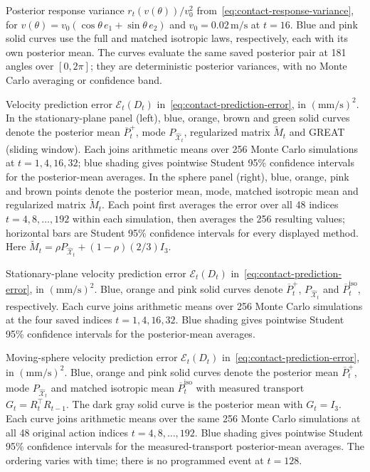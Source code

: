 \caption{Posterior response variance $r_t(v(\theta))/v_0^2$ from~\eqref{eq:contact-response-variance}, for $v(\theta)=v_0(\cos\theta\,e_1+\sin\theta\,e_2)$ and $v_0=0.02\,\mathrm{m/s}$ at $t=16$. Blue and pink solid curves use the full and matched isotropic laws, respectively, each with its own posterior mean. The curves evaluate the same saved posterior pair at 181 angles over $[0,2\pi]$; they are deterministic posterior variances, with no Monte Carlo averaging or confidence band.}

\caption{Velocity prediction error $\mathcal E_t(D_t)$ in~\eqref{eq:contact-prediction-error}, in $(\mathrm{mm}/\mathrm{s})^2$. In the stationary-plane panel (left), blue, orange, brown and green solid curves denote the posterior mean $\overline P_t^+$, mode $P_{\widehat{\mathcal X}_t}$, regularized matrix $\widetilde M_t$ and GREAT (sliding window). Each joins arithmetic means over 256 Monte Carlo simulations at $t=1,4,16,32$; blue shading gives pointwise Student 95\% confidence intervals for the posterior-mean averages. In the sphere panel (right), blue, orange, pink and brown points denote the posterior mean, mode, matched isotropic mean and regularized matrix $\widetilde M_t$. Each point first averages the error over all 48 indices $t=4,8,\ldots,192$ within each simulation, then averages the 256 resulting values; horizontal bars are Student 95\% confidence intervals for every displayed method. Here $\widetilde M_t=\rho P_{\widehat{\mathcal X}_t}+(1-\rho)(2/3)I_3$.}

\caption{Stationary-plane velocity prediction error $\mathcal E_t(D_t)$ in~\eqref{eq:contact-prediction-error}, in $(\mathrm{mm}/\mathrm{s})^2$. Blue, orange and pink solid curves denote $\overline P_t^+$, $P_{\widehat{\mathcal X}_t}$ and $\overline P_t^{\mathrm{iso}}$, respectively. Each curve joins arithmetic means over 256 Monte Carlo simulations at the four saved indices $t=1,4,16,32$. Blue shading gives pointwise Student 95\% confidence intervals for the posterior-mean averages.}

\caption{Moving-sphere velocity prediction error $\mathcal E_t(D_t)$ in~\eqref{eq:contact-prediction-error}, in $(\mathrm{mm}/\mathrm{s})^2$. Blue, orange and pink solid curves denote the posterior mean $\overline P_t^+$, mode $P_{\widehat{\mathcal X}_t}$ and matched isotropic mean $\overline P_t^{\mathrm{iso}}$ with measured transport $G_t=R_t^\top R_{t-1}$. The dark gray solid curve is the posterior mean with $G_t=I_3$. Each curve joins arithmetic means over the same 256 Monte Carlo simulations at all 48 original action indices $t=4,8,\ldots,192$. Blue shading gives pointwise Student 95\% confidence intervals for the measured-transport posterior-mean averages. The ordering varies with time; there is no programmed event at $t=128$.}

